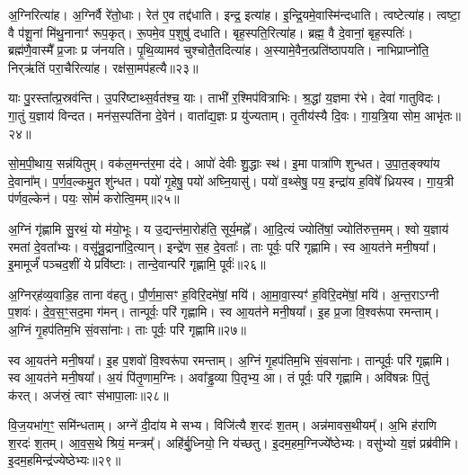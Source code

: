 अ॒ग्निरित्या॑ह।
अ॒ग्निर्वै रे॑तो॒धाः।
रेत॑ ए॒व तद्द॑धाति।
इन्द्र॒ इत्या॑ह।
इ॒न्द्रि॒यमे॒वास्मि॑न्दधाति।
त्वष्टेत्या॑ह।
त्वष्टा॒ वै प॑शू॒नां मि॑थु॒नानाꣳ॑ रूप॒कृत्।
रू॒पमे॒व प॒शुषु॑ दधाति।
बृह॒स्पति॒रित्या॑ह।
ब्रह्म॒ वै दे॒वानां॒ बृह॒स्पतिः॑।
ब्रह्म॑णै॒वास्मै᳚ प्र॒जाः प्र ज॑नयति।
पृ॒थि॒व्यामव॑ चुश्चोतै॒तदित्या॑ह।
अ॒स्यामे॒वैन॒त्प्रति॑\-ष्ठापयति।
नाभिप्राप्नो॑ति॒ निर्‌\mbox{}ऋ॑तिं परा॒चैरित्या॑ह।
रक्ष॑सा॒मप॑हत्यै॥२३॥\ip{}

याः पु॒रस्ता᳚त्प्र॒स्रव॑न्ति।
उ॒परि॑ष्टाथ्स॒र्वत॑श्च॒ याः।
ताभी॑ र॒श्मिप॑वित्राभिः।
श्र॒द्धां य॒ज्ञमा र॑भे।
देवा॑ गातुविदः।
गा॒तुं य॒ज्ञाय॑ विन्दत।
मन॑स॒स्पति॑ना दे॒वेन॑।
वाता᳚द्य॒ज्ञः प्र यु॑ज्यताम्।
तृ॒तीय॑स्यै दि॒वः।
गा॒य॒त्रि॒या सोम॒ आभृ॑तः॥२४॥\ip

सो॒म॒पी॒थाय॒ सन्न॑यितुम्।
वक॑ल॒मन्त॑र॒मा द॑दे।
आपो॑ देवीः शु॒द्धाः स्थ॑।
इ॒मा पात्रा॑णि शुन्धत।
उ॒पा॒त॒ङ्क्या॑य दे॒वाना᳚म्।
प॒र्ण॒व॒ल्कमु॒त शु॑न्धत।
पयो॑ गृ॒हेषु॒ पयो॑ अघ्नि॒यासु॑।
पयो॑ व॒थ्सेषु॒ पय॒ इन्द्रा॑य ह॒विषे᳚ ध्रियस्व।
गा॒य॒त्री प॑र्णव॒ल्केन॑।
पयः॒ सोमं॑ करोत्वि॒मम्॥२५॥\ip

अ॒ग्निं गृ॑ह्णामि सु॒रथं॒ यो म॑यो॒भूः।
य उ॒द्यन्त॑मा॒रोह॑ति॒ सूर्य॒मह्ने᳚।
आ॒दि॒त्यं ज्योति॑षां॒ ज्योति॑रुत्त॒मम्।
श्वो य॒ज्ञाय॑ रमतां दे॒वता᳚भ्यः।
वसू᳚न्रु॒द्राना॑दि॒त्यान्।
इन्द्रे॑ण स॒ह दे॒वताः᳚।
ताः पूर्वः॒ परि॑ गृह्णामि।
स्व आ॒यत॑ने मनी॒षया᳚।
इ॒मामूर्जं॑ पञ्चद॒शीं ये प्रवि॑ष्टाः।
तान्दे॒वान्परि॑ गृह्णामि॒ पूर्वः॑॥२६॥\ip

अ॒ग्निर्‌\mbox{}ह॑व्य॒वाडि॒ह ताना व॑हतु।
पौ॒र्ण॒मा॒सꣳ ह॒विरि॒दमे॑षां॒ मयि॑।
आ॒मा॒वा॒स्यꣳ॑ ह॒विरि॒दमे॑षां॒ मयि॑।
अ॒न्त॒रा\-ऽग्नी प॒शवः॑।
दे॒व॒स॒ꣳ॒सद॒मा ग॑मन्।
तान्पूर्वः॒ परि॑ गृह्णामि।
स्व आ॒यत॑ने मनी॒षया᳚।
इ॒ह प्र॒जा वि॒श्वरू॑पा रमन्ताम्।
अ॒ग्निं गृ॒हप॑तिम॒भि सं॒वसा॑नाः।
ताः पूर्वः॒ परि॑ गृह्णामि॥२७॥\ip

स्व आ॒यत॑ने मनी॒षया᳚।
इ॒ह प॒शवो॑ वि॒श्वरू॑पा रमन्ताम्।
अ॒ग्निं गृ॒हप॑तिम॒भि सं॒वसा॑नाः।
तान्पूर्वः॒ परि॑ गृह्णामि।
स्व आ॒यत॑ने मनी॒षया᳚।
अ॒यं पि॑तृ॒णाम॒ग्निः।
अवा᳚ड्ढ॒व्या पि॒तृभ्य॒ आ।
तं पूर्वः॒ परि॑ गृह्णामि।
अवि॑षन्नः पि॒तुं क॑रत्।
अज॑स्रं॒ त्वाꣳ स॑भापा॒लाः॥२८॥\ip

वि॒ज॒यभा॑ग॒ꣳ॒ समि॑न्धताम्।
अग्ने॑ दी॒दा॑य मे सभ्य।
विजि॑त्यै श॒रदः॑ श॒तम्।
अन्न॑मावस॒थीयम्᳚।
अ॒भि ह॑राणि श॒रदः॑ श॒तम्।
आ॒व॒स॒थे श्रियं॒ मन्त्रम्᳚।
अहि॑र्बु॒ध्नियो॒ नि य॑च्छतु।
इ॒द\-म॒ह\-म॒ग्नि\-ज्ये᳚ष्ठेभ्यः।
वसु॑भ्यो य॒ज्ञं प्रब्र॑वीमि।
इ॒द\-म॒ह\-मिन्द्र॑\-ज्येष्ठेभ्यः॥२९॥\ip

